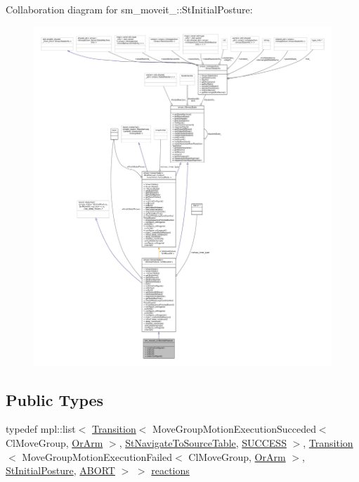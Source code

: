 Collaboration diagram for sm\+\_\+moveit\+\_\+:\+:St\+Initial\+Posture\+:
\nopagebreak
\begin{figure}[H]
\begin{center}
\leavevmode
\includegraphics[width=350pt]{structsm__moveit__4_1_1StInitialPosture__coll__graph}
\end{center}
\end{figure}
\subsection*{Public Types}
\begin{DoxyCompactItemize}
\item 
typedef mpl\+::list$<$ \hyperlink{classsmacc_1_1Transition}{Transition}$<$ Move\+Group\+Motion\+Execution\+Succeded$<$ Cl\+Move\+Group, \hyperlink{classsm__moveit__4_1_1OrArm}{Or\+Arm} $>$, \hyperlink{structsm__moveit__4_1_1StNavigateToSourceTable}{St\+Navigate\+To\+Source\+Table}, \hyperlink{structsmacc_1_1default__transition__tags_1_1SUCCESS}{S\+U\+C\+C\+E\+SS} $>$, \hyperlink{classsmacc_1_1Transition}{Transition}$<$ Move\+Group\+Motion\+Execution\+Failed$<$ Cl\+Move\+Group, \hyperlink{classsm__moveit__4_1_1OrArm}{Or\+Arm} $>$, \hyperlink{structsm__moveit__4_1_1StInitialPosture}{St\+Initial\+Posture}, \hyperlink{structsmacc_1_1default__transition__tags_1_1ABORT}{A\+B\+O\+RT} $>$ $>$ \hyperlink{structsm__moveit__4_1_1StInitialPosture_aa7e1e0f670642dd9378217cb028a42f3}{reactions}
\end{DoxyCompactItemize}
